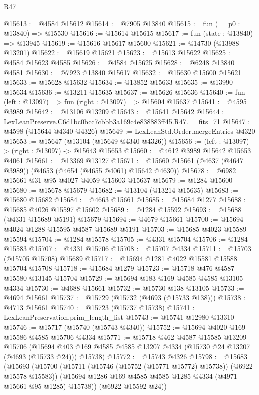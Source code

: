 \begin{lexlean}{R47}
\begin{coremodule}
@15613 := @4584 @15612
@15614 := @7905 @13840
@15615 := fun (__p0 : @13840) => @15530
@15616 := @15614 @15615
@15617 := fun (state : @13840) => @13945
@15619 := @15616 @15617 @15600
@15621 := @14730 (@13988 @13201)
@15622 := @15619 @15621
@15623 := @15613 @15622
@15625 := @4584 @15623 @4585
@15626 := @4584 @15625
@15628 := @6248 @13840 @4581
@15630 := @7923 @13840 @15617
@15632 := @15630 @15600 @15621
@15633 := @15628 @15632
@15634 := @13852 @15633
@15635 := @13990 @15634
@15636 := @13211 @15635
@15637 := @15626 @15636
@15640 := fun (left : @13097) => fun (right : @13097) => @15604 @15637
@15641 := @4595 @3989
@15642 := @13106 @13209
@15643 := @15641 @15642
@15644 := LexLeanPreserve.C6d1bc0bcc7cbbb3a169c4e838883ff45.R47.__fits_71
@15647 := @4598 (@15644 @4340 @4326)
@15649 := LexLeanStd.Order.mergeEntries @4320
@15653 := @15647 (@13104 (@15649 @4340 @4326))
@15656 := (left : @13097) -> (right : @13097) -> @15643 @15653
@15660 := @4612 @3989 @15642 @15653 @4061
@15661 := @13369 @13127
@15671 := @15660 @15661 (@4637 (@4647 @3989)) (@4653 (@4654 (@4655 @4061) @15642 @4630))
@15678 := @6982 @15661 @31 @95 @4027 @4059 @15603 @15637
@15679 := @1284 @15600
@15680 := @15678 @15679
@15682 := @13104 (@13214 @15635)
@15683 := @15680 @15682
@15684 := @4663 @15661
@15685 := @15684 @1277
@15688 := @15685 @4026 @15597 @15602
@15689 := @1284 @15592
@15693 := @15688 (@4331 @15689 @5191) @15679
@15694 := @4679 @15661
@15700 := @15694 @4024 @1288 @15595 @4587 @15689 @5191
@15703 := @15685 @4023 @15589 @15594
@15704 := @1284 @15578
@15705 := @4331 @15704
@15706 := @1284 @15583
@15707 := @4331 @15706
@15708 := @15707 @4334
@15711 := @15703 (@15705 @15708) @15689
@15717 := @15694 @1281 @4022 @15581 @15588 @15704 @15708
@15718 := @15684 @1279
@15723 := @15718 @476 @4587 @15580 @13145 @15704
@15729 := @15694 @183 @169 @4585 @4585 @13105 @4334
@15730 := @4688 @15661
@15732 := @15730 @138 @13105
@15733 := @4694 @15661
@15737 := @15729 (@15732 (@4693 (@15733 @138)))
@15738 := @4713 @15661
@15740 := @15723 (@15737 @15738)
@15741 := LexLeanPreservation.prim_length_list
@15743 := @15741 @12980 @13310
@15746 := @15717 (@15740 (@15743 @4340))
@15752 := @15694 @4020 @169 @15586 @4585 @15706 @4334
@15771 := @15718
    @462
    @4587
    @15585
    @13209
    @15706
    (@15694 @403 @169 @4585 @4585 @13207 @4334 (@15730 @24 @13207 (@4693 (@15733 @24))) @15738)
@15772 := @15743 @4326
@15798 := @15683
    (@15693
      (@15700
        (@15711 (@15746 (@15752 (@15771 @15772) @15738)) (@6922 @15578 @15583))
        (@15694 @1286 @169 @4585 @4585 @1285 @4334 (@4971 @15661 @95 @1285) @15738))
      (@6922 @15592 @24))

\end{coremodule}
\end{lexlean}

